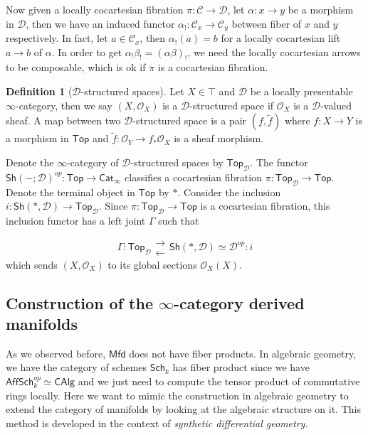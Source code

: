 \documentclass[12pt]{amsart}
\theoremstyle{definition}
\newtheorem{defn}[thm]{Definition}
\theoremstyle{remark}
\numberwithin{equation}{section}
\newcommand{\CO}{{\mathcal O}}
\newcommand{\1}{{\mathbb{1}}}
\newcommand{\mfd}{\mathsf{Mfd}}
\newcommand{\sch}{\mathsf{Sch}}
\newcommand{\aff}{\mathsf{Aff}}\newcommand{\alg}{\mathsf{Alg}}
\newcommand{\calg}{\mathsf{CAlg}}
\newcommand{\sh}{\mathsf{Sh}}
\newcommand{\Top}{\mathsf{Top}}
\newcommand{\cat}{\mathsf{Cat}}
\begin{document}
Now given a locally cocartesian fibration $\pi: \mathcal{C}\to \mathcal{D}$, let $\alpha: x\to y$ be a morphism in $\mathcal{D}$, then we have an induced functor $\alpha_! : \mathcal{C}_x \to \mathcal{C}_y$ between fiber of $x$ and $y$ respectively. In fact, let $a\in \mathcal{C}_x$, then $\alpha_!(a)=b$ for a locally cocartesian lift $a\to b$ of $\alpha$. In order to get $\alpha_!\beta_!= (\alpha\beta)_!$, we need the locally cocartesian arrows to be composable, which is ok if $\pi$ is a cocartesian fibration.

\begin{defn}[$\mathcal{D}$-structured spaces]
	Let $X\in \top$ and $\mathcal{D}$ be a locally presentable $\infty$-category, then we say $(X,\CO_X)$ is a $\mathcal{D}$-structured space if $\CO_X$ is a $\mathcal{D}$-valued sheaf. A map between two $\mathcal{D}$-structured space is a pair $(f, \tilde{f})$ where $f:X\to Y$ is a morphism in $\Top$ and $\tilde{f}: \CO_Y \to f_{*}\CO_X$ is a sheaf morphism. 
\end{defn}

Denote the $\infty$-category of $\mathcal{D}$-structured spaces by $\Top_{\mathcal{D}}$. The functor $\sh(-;\mathcal{D})^{op}: \Top\to \cat_{\infty}$ classifies a cocartesian fibration $\pi : \Top_{\mathcal{D}}\to \Top$. Denote the terminal object in $\Top$ by $*$. Consider the inclusion $i: \sh(*, \mathcal{D})\to \Top_{\mathcal{D}}$. Since $\pi: \Top_{\mathcal{D}}\to \Top$ is a cocartesian fibration, this inclusion functor has a left joint $\Gamma$ such that

\begin{equation*} 
\Gamma: \Top_{\mathcal{D}} \substack{\longrightarrow\\[-1em]  \longleftarrow}\sh(*, \mathcal{D})\simeq \mathcal{D}^{op} : i
\end{equation*}
which sends $(X, \CO_X)$ to its global sections $\CO_X(X)$.
\subsection{Construction of the $\infty$-category derived manifolds}

As we observed before, $\mfd$ does not have fiber products. In algebraic geometry, we have the category of schemes $\sch_k$ has fiber product since we have $\aff\sch^{op}_k\simeq \calg$ and we just need to compute the tensor product of commutative rings locally. Here we want to mimic the construction in algebraic geometry to extend the category of manifolds by looking at the algebraic structure on it. This method is developed in the context of {\it synthetic differential geometry}.
\end{document}
